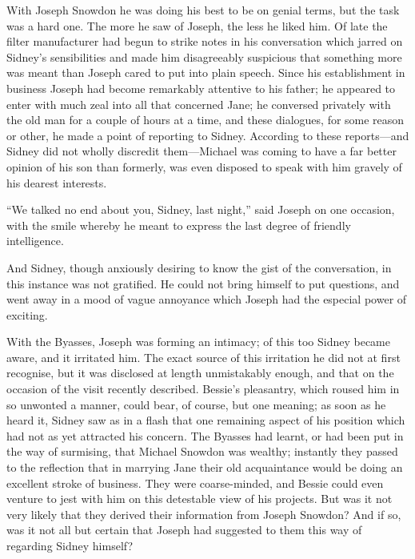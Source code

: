 With Joseph Snowdon he was doing his best to be on genial terms, but the
task was a hard one. The more he saw of Joseph, the less he liked him.
Of late the filter manufacturer had begun to strike notes in his
conversation which jarred on Sidney's sensibilities and made him
disagreeably suspicious that something more was meant than Joseph
{\protect\hypertarget{278}{}{}}cared to put into plain speech. Since his
establishment in business Joseph had become remarkably attentive to his
father; he appeared to enter with much zeal into all that concerned
Jane; he conversed privately with the old man for a couple of hours at a
time, and these dialogues, for some reason or other, he made a point of
reporting to Sidney. According to these reports---and Sidney did not
wholly discredit them---Michael was coming to have a far better opinion
of his son than formerly, was even disposed to speak with him gravely of
his dearest interests.

``We talked no end about you, Sidney, last night,'' said Joseph on one
occasion, with the smile whereby he meant to express the last degree of
friendly intelligence.

And Sidney, though anxiously desiring to know the gist of the
conversation, in this instance was not gratified. He could not bring
himself to put questions, and went away in a mood of vague annoyance
which Joseph had the especial power of exciting.

With the Byasses, Joseph was forming an
{\protect\hypertarget{279}{}{}}intimacy; of this too Sidney became
aware, and it irritated him. The exact source of this irritation he did
not at first recognise, but it was disclosed at length unmistakably
enough, and that on the occasion of the visit recently described.
Bessie's pleasantry, which roused him in so unwonted a manner, could
bear, of course, but one meaning; as soon as he heard it, Sidney saw as
in a flash that one remaining aspect of his position which had not as
yet attracted his concern. The Byasses had learnt, or had been put in
the way of surmising, that Michael Snowdon was wealthy; instantly they
passed to the reflection that in marrying Jane their old acquaintance
would be doing an excellent stroke of business. They were coarse-minded,
and Bessie could even venture to jest with him on this detestable view
of his projects. But was it not very likely that they derived their
information from Joseph Snowdon? And if so, was it not all but certain
that Joseph had suggested to them this way of regarding Sidney himself?

